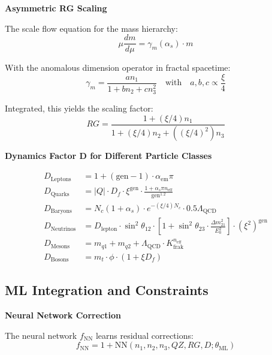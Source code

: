 	\textbf{Asymmetric RG Scaling}
	
	The scale flow equation for the mass hierarchy:
	\begin{equation}
		\mu \frac{dm}{d\mu} = \gamma_m(\alpha_s) \cdot m
	\end{equation}
	
	With the anomalous dimension operator in fractal spacetime:
	\begin{equation}
		\gamma_m = \frac{a n_1}{1 + b n_2 + c n_3^2} \quad \text{with} \quad a,b,c \propto \frac{\xi}{4}
	\end{equation}
	
	Integrated, this yields the scaling factor:
	\begin{equation}
		RG = \frac{1 + (\xi/4) n_1}{1 + (\xi/4) n_2 + ((\xi/4)^2) n_3}
	\end{equation}
	
	\textbf{Dynamics Factor D for Different Particle Classes}
	
	\begin{align}
		D_{\text{Leptons}} &= 1 + (\text{gen} - 1) \cdot \alpha_{\text{em}} \pi \\
		D_{\text{Quarks}} &= |Q| \cdot D_f \cdot \xi^{\text{gen}} \cdot \frac{1 + \alpha_s \pi n_{\text{eff}}}{\text{gen}^{1.2}} \\
		D_{\text{Baryons}} &= N_c (1 + \alpha_s) \cdot e^{-(\xi/4) N_c} \cdot 0.5 \Lambda_{\text{QCD}} \\
		D_{\text{Neutrinos}} &= D_{\text{lepton}} \cdot \sin^2 \theta_{12} \cdot \left[1 + \sin^2 \theta_{23} \cdot \frac{\Delta m^2_{21}}{E_0^2}\right] \cdot (\xi^2)^{\text{gen}} \\
		D_{\text{Mesons}} &= m_{q1} + m_{q2} + \Lambda_{\text{QCD}} \cdot K_{\text{frak}}^{n_{\text{eff}}} \\
		D_{\text{Bosons}} &= m_t \cdot \phi \cdot (1 + \xi D_f)
	\end{align}
	
	\subsection{ML Integration and Constraints}
	
	\textbf{Neural Network Correction}
	
	The neural network $f_{\text{NN}}$ learns residual corrections:
	\begin{equation}
		f_{\text{NN}} = 1 + \text{NN}(n_1, n_2, n_3, QZ, RG, D; \theta_{\text{ML}})
	\end{equation}
	
